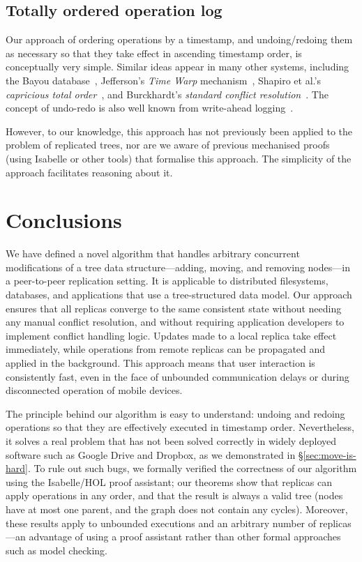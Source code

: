 \documentclass[10pt,journal,compsoc]{IEEEtran}
\begin{document}
\subsection{Totally ordered operation log}

Our approach of ordering operations by a timestamp, and undoing/redoing them as necessary so that they take effect in ascending timestamp order, is conceptually very simple.
Similar ideas appear in many other systems, including the Bayou database~\cite{Terry:1995dn}, Jefferson's \emph{Time Warp} mechanism~\cite{Jefferson:1985em}, Shapiro et al.'s \emph{capricious total order}~\cite{Shapiro:2016hp}, and Burckhardt's \emph{standard conflict resolution}~\cite[{\S}4.3.3]{Burckhardt:2014hy}.
The concept of undo-redo is also well known from write-ahead logging~\cite{Mohan:1992fe}.

However, to our knowledge, this approach has not previously been applied to the problem of replicated trees, nor are we aware of previous mechanised proofs (using Isabelle or other tools) that formalise this approach.
The simplicity of the approach facilitates reasoning about it.

\section{Conclusions}

We have defined a novel algorithm that handles arbitrary concurrent modifications of a tree data structure---adding, moving, and removing nodes---in a peer-to-peer replication setting.
It is applicable to distributed filesystems, databases, and applications that use a tree-structured data model.
Our approach ensures that all replicas converge to the same consistent state without needing any manual conflict resolution, and without requiring application developers to implement conflict handling logic.
Updates made to a local replica take effect immediately, while operations from remote replicas can be propagated and applied in the background.
This approach means that user interaction is consistently fast, even in the face of unbounded communication delays or during disconnected operation of mobile devices.

The principle behind our algorithm is easy to understand: undoing and redoing operations so that they are effectively executed in timestamp order.
Nevertheless, it solves a real problem that has not been solved correctly in widely deployed software such as Google Drive and Dropbox, as we demonstrated in \S\ref{sec:move-is-hard}.
To rule out such bugs, we formally verified the correctness of our algorithm using the Isabelle/HOL proof assistant; our theorems show that replicas can apply operations in any order, and that the result is always a valid tree (nodes have at most one parent, and the graph does not contain any cycles).
Moreover, these results apply to unbounded executions and an arbitrary number of replicas---an advantage of using a proof assistant rather than other formal approaches such as model checking.
\end{document}
